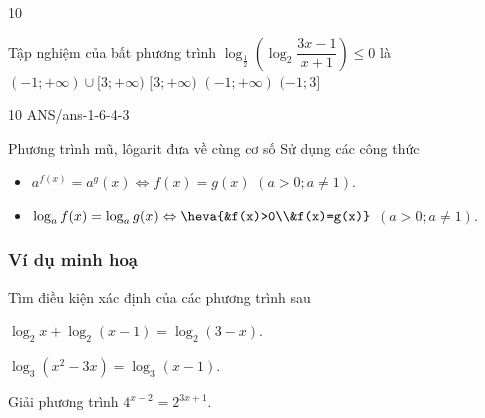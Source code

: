 \begin{indapan}{10}
\begin{ex}
\end{ex}
\begin{ex}
	Tập nghiệm của bất phương trình $\log_\frac{1}{2} \left ( \log_2 \dfrac{3x-1}{x+1}\right ) \leq 0$ là
	\choice
	{\True $(-1;+\infty) \cup [3;+\infty)$}
	{$[3;+\infty)$}
	{$(-1;+\infty)$}
	{$(-1;3]$}
	\loigiai{
		$\log_\frac{1}{2} \left ( \log_2 \dfrac{3x-1}{x+1}\right ) \leq 0 \Leftrightarrow \dfrac{3x-1}{x+1} \geq 2 \Leftrightarrow \dfrac{x-3}{x+1} \geq 0 \Leftrightarrow x \in (-1;+\infty) \cup [3;+\infty)$.
	}
\end{ex}
\begin{indapan}{10}
	{ANS/ans-1-6-4-3}
\end{indapan}


\begin{dang}{Phương trình mũ, lôgarit đưa về cùng cơ số}
	Sử dụng các công thức
	\begin{itemize}
		\item $a^{f(x)}=a^g(x) \Leftrightarrow f(x)=g(x)$ $(a>0; a\neq 1)$.
		\item $\log_a f(x)=\log_a g(x)\Leftrightarrow \heva{&f(x)>0\\&f(x)=g(x)}$ $(a>0;a\neq 1)$.
	\end{itemize}
\end{dang}
\subsubsection{Ví dụ minh hoạ}
\begin{vd}%
	Tìm điều kiện xác định của các phương trình sau
	\begin{listEX}[2]
		\item $\log_2x+\log_2(x-1)=\log_2(3-x)$.
		\item $\log_3(x^2-3x)=\log_3(x-1)$.
	\end{listEX}
\end{vd}

\begin{vd} %
	Giải phương trình $4^{x-2}=2^{3x+1}$.
\end{vd}


\end{indapan}
